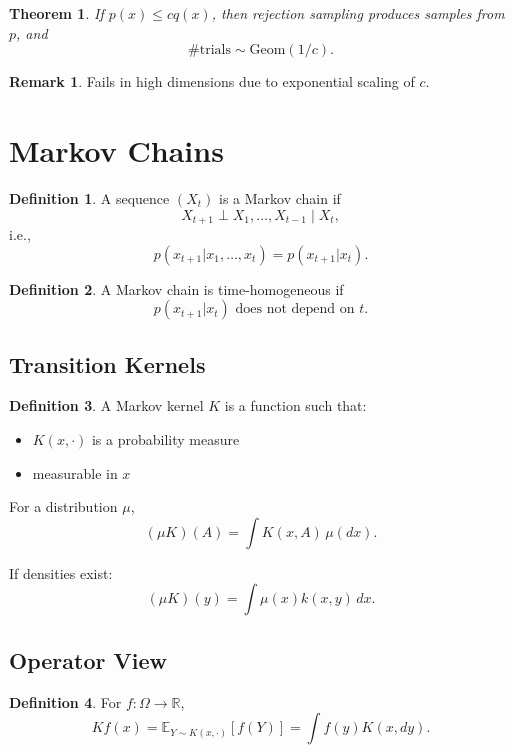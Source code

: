 \documentclass[12pt,oneside]{book}
\numberwithin{equation}{section}
\theoremstyle{definition}
\newtheorem{definition}{Definition}[section]
\newtheorem{remark}{Remark}[section]
\theoremstyle{plain}
\newtheorem{theorem}{Theorem}[section]
\theoremstyle{remark}
\newcommand{\R}{\mathbb{R}}
\newcommand{\E}{\mathbb{E}}
\begin{document}
\begin{theorem}
If $p(x) \le c q(x)$, then rejection sampling produces samples from $p$, and
\[
\#\text{trials} \sim \mathrm{Geom}(1/c).
\]
\end{theorem}

\begin{remark}
Fails in high dimensions due to exponential scaling of $c$.
\end{remark}


\section{Markov Chains}

\begin{definition}
A sequence $(X_t)$ is a Markov chain if
\[
X_{t+1} \perp X_1,\dots,X_{t-1} \mid X_t,
\]
i.e.,
\[
p(x_{t+1} | x_1,\dots,x_t) = p(x_{t+1} | x_t).
\]
\end{definition}

\begin{definition}
A Markov chain is time-homogeneous if
\[
p(x_{t+1} | x_t) \text{ does not depend on } t.
\]
\end{definition}


\subsection*{Transition Kernels}

\begin{definition}
A Markov kernel $K$ is a function such that:
\begin{itemize}
\item $K(x,\cdot)$ is a probability measure
\item measurable in $x$
\end{itemize}
\end{definition}

For a distribution $\mu$,
\[
(\mu K)(A) = \int K(x,A)\,\mu(dx).
\]

If densities exist:
\[
(\mu K)(y) = \int \mu(x)k(x,y)\,dx.
\]


\subsection*{Operator View}

\begin{definition}
For $f : \Omega \to \R$,
\[
Kf(x) = \E_{Y \sim K(x,\cdot)}[f(Y)]
= \int f(y)K(x,dy).
\]
\end{definition}
\end{document}
